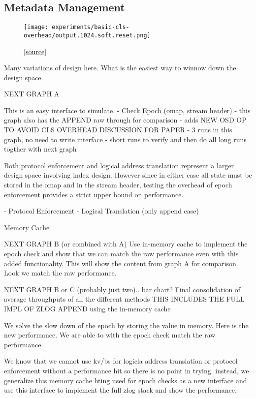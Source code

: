 \documentclass[10pt,twocolumn]{article}
\begin{document}
\subsection{Metadata Management}

\begin{figure}[h]
  \centering
  \texttt{[image: experiments/basic-cls-overhead/output.1024.soft.reset.png]}
  \caption{
[\href{https://github.com/noahdesu/zlog-popper/tree/master/experiments/basic-cls-overhead/visualize.ipynb}{source}]
}
\end{figure}

Many variations of design here. What is the easiest way to 
winnow down the design space.

NEXT GRAPH A

This is an easy interface to simulate.
- Check Epoch (omap, stream header)
- this graph also has the APPEND raw through for comparison
- adds NEW OSD OP TO AVOID CLS OVERHEAD DISCUSSION FOR PAPER
- 3 runs in this graph, no need to write interface
- short runs to verify and then do all long runs togther with next graph

Both protocol enforcement and logical address translation
represent a larger design space involving index design. However
since in either case all state must be stored in the omap and
in the stream header, testing the overhead of epoch enforcement
provides a strict upper bound on performance.

- Protocol Enforcement
- Logical Translation (only append case)

Memory Cache

NEXT GRAPH B (or combined with A)
Use in-memory cache to implement the epoch check and show that we can match
the raw performance even with this added functionality.
This will show the content from graph A for comparison. Look
we match the raw performance.

NEXT GRAPH B or C (probably just two).. bar chart?
 Final consolidation of average throughputs of all the different
methods
 THIS INCLUDES THE FULL IMPL OF ZLOG APPEND using the in-memory cache

We solve the slow down of the epoch by storing the value in memory. Here is
the new performance.  We are able to with the epoch check match the raw
performance.

We know that we cannot use kv/bs for logicla address translation or protocol
enforcement without a performance hit so there is no point in trying. instead,
we generalize this memory cache hting used for epoch checks as a
new interface and use this interface to implement the full zlog
stack and show the performance.
\end{document}
